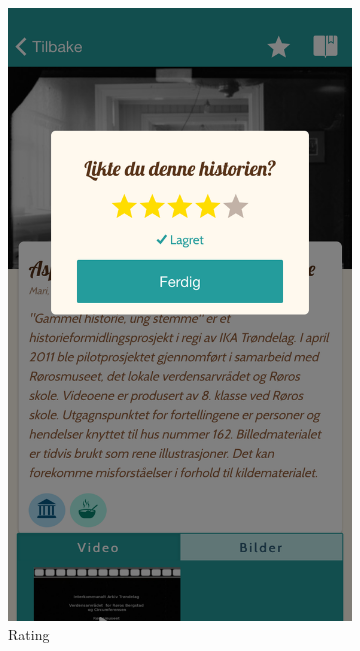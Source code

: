 \begin{appendices}
\begin{figure}[h]
	\end{figure}
	\begin{figure}[h]
		\ContinuedFloat
		\centering
		\begin{subfigure}[h]{0.3\textwidth}
			\includegraphics[width=\textwidth]{fig/screenshot_rating}
			\caption{Rating}
		\end{subfigure}
		\begin{subfigure}[h]{0.3\textwidth}

\end{subfigure}
\end{figure}
\end{appendices}
